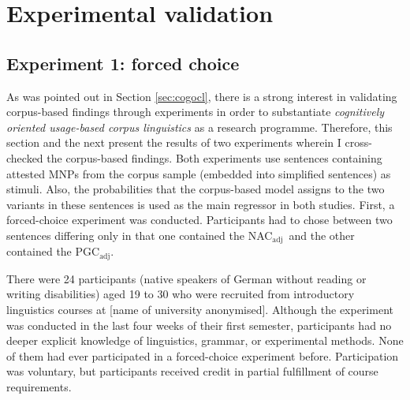 \documentclass[USenglish]{article}
\newcommand{\Sub}[1]{\ensuremath{\mathrm{_{#1}}}}
\newcommand{\NACa}{NAC\Sub{adj}}
\newcommand{\PGCa}{PGC\Sub{adj}}
\begin{document}


\section{Experimental validation}
\label{sec:externalvalidation}

\subsection{Experiment 1: forced choice}
\label{sec:exp:fc}

As was pointed out in Section \ref{sec:cogocl}, there is a strong interest in validating corpus-based findings through experiments in order to substantiate \textit{cognitively oriented usage-based corpus linguistics} as a research programme.
Therefore, this section and the next present the results of two experiments wherein I cross-checked the corpus-based findings.
Both experiments use sentences containing attested MNPs from the corpus sample (embedded into simplified sentences) as stimuli.
Also, the probabilities that the corpus-based model assigns to the two variants in these sentences is used as the main regressor in both studies.
First, a forced-choice experiment was conducted.
Participants had to chose between two sentences differing only in that one contained the \NACa\ and the other contained the \PGCa.

There were 24 participants (native speakers of German without reading or writing disabilities) aged 19 to 30 who were recruited from introductory linguistics courses at [name of university anonymised].
Although the experiment was conducted in the last four weeks of their first semester, participants had no deeper explicit knowledge of linguistics, grammar, or experimental methods.
None of them had ever participated in a forced-choice experiment before.
Participation was voluntary, but participants received credit in partial fulfillment of course requirements.
\end{document}
